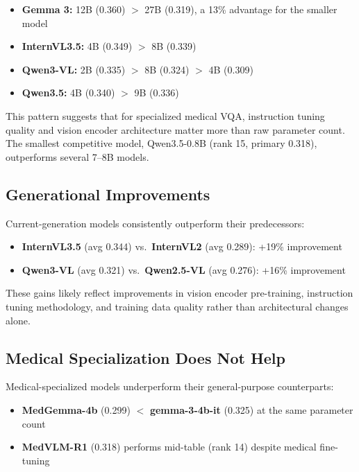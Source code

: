 \documentclass[11pt,a4paper]{article}
\begin{document}
\begin{itemize}
    \item \textbf{Gemma 3:} 12B (0.360) $>$ 27B (0.319), a 13\% advantage for the smaller model
    \item \textbf{InternVL3.5:} 4B (0.349) $>$ 8B (0.339)
    \item \textbf{Qwen3-VL:} 2B (0.335) $>$ 8B (0.324) $>$ 4B (0.309)
    \item \textbf{Qwen3.5:} 4B (0.340) $>$ 9B (0.336)
\end{itemize}

This pattern suggests that for specialized medical VQA, instruction tuning quality and vision encoder architecture matter more than raw parameter count. The smallest competitive model, Qwen3.5-0.8B (rank 15, primary 0.318), outperforms several 7--8B models.

\subsection{Generational Improvements}

Current-generation models consistently outperform their predecessors:

\begin{itemize}
    \item \textbf{InternVL3.5} (avg 0.344) vs.\ \textbf{InternVL2} (avg 0.289): +19\% improvement
    \item \textbf{Qwen3-VL} (avg 0.321) vs.\ \textbf{Qwen2.5-VL} (avg 0.276): +16\% improvement
\end{itemize}

These gains likely reflect improvements in vision encoder pre-training, instruction tuning methodology, and training data quality rather than architectural changes alone.

\subsection{Medical Specialization Does Not Help}

Medical-specialized models underperform their general-purpose counterparts:

\begin{itemize}
    \item \textbf{MedGemma-4b} (0.299) $<$ \textbf{gemma-3-4b-it} (0.325) at the same parameter count
    \item \textbf{MedVLM-R1} (0.318) performs mid-table (rank 14) despite medical fine-tuning
\end{itemize}
\end{document}
